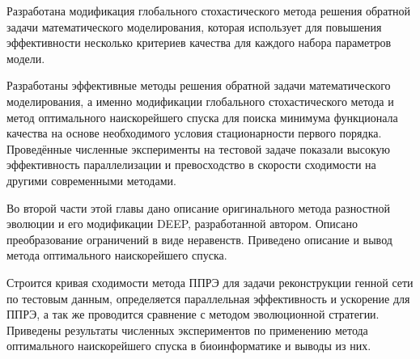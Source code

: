 Разработана модификация глобального стохастического метода решения обратной задачи математического моделирования, которая использует для повышения эффективности несколько критериев качества для каждого набора параметров модели.

Разработаны эффективные методы решения обратной задачи математического моделирования, а именно модификации глобального стохастического метода и метод оптимального наискорейшего спуска для поиска минимума функционала качества на основе необходимого условия стационарности первого порядка. Проведённые численные эксперименты на тестовой задаче показали высокую эффективность параллелизации и превосходство в скорости сходимости на другими современными методами.

Во второй части этой главы дано описание оригинального метода разностной эволюции и его модификации DEEP, разработанной автором. Описано преобразование ограничений в виде неравенств. Приведено описание и вывод метода оптимального наискорейшего спуска.

Строится кривая сходимости метода ППРЭ для задачи реконструкции генной сети по тестовым данным, определяется параллельная эффективность и ускорение для ППРЭ, а так же проводится сравнение с методом эволюционной стратегии. Приведены результаты численных экспериментов по применению метода оптимального наискорейшего спуска в биоинформатике и выводы из них.


